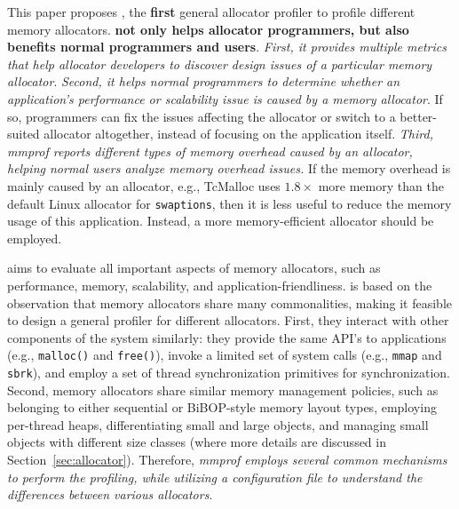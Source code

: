 This paper proposes \MP{}, the \textbf{first} general allocator profiler to profile different memory allocators. \textbf{\MP{} not only helps allocator programmers, but also benefits normal programmers and users}. \textit{First, it provides multiple metrics that help allocator developers to discover design issues of a particular memory allocator}. \textit{Second, it helps normal programmers to determine whether an application's performance or scalability issue is caused by a memory allocator}. 
If so, programmers can fix the issues affecting the allocator or switch to a better-suited allocator altogether, instead of focusing on the application itself. 
\textit{Third, mmprof reports different types of memory overhead caused by an allocator, helping normal users analyze memory overhead issues.} 
If the memory overhead is mainly caused by an allocator, e.g., TcMalloc uses $1.8\times$ more memory than the default Linux allocator for \texttt{swaptions}, then it is less useful to reduce the memory usage of this application. Instead, a more memory-efficient allocator should be employed.   


\MP{} aims to evaluate all important aspects of memory allocators, such as performance, memory, scalability, and application-friendliness. \MP{} is based on the observation that memory allocators share many commonalities, making it feasible to design a general profiler for different allocators. First, they interact with other components of the system similarly: they provide the same API's to applications (e.g., \texttt{malloc()} and \texttt{free()}), invoke a limited set of system calls (e.g., \texttt{mmap} and \texttt{sbrk}), and employ a set of thread synchronization primitives for synchronization. Second, memory allocators share similar memory management policies, such as belonging to either sequential or BiBOP-style memory layout types, employing per-thread heaps, differentiating small and large objects, and managing small objects with different size classes (where more details are discussed in Section~\ref{sec:allocator}). Therefore, \textit{mmprof employs several common mechanisms to perform the profiling, while utilizing a configuration file to understand the differences between various allocators}.    

